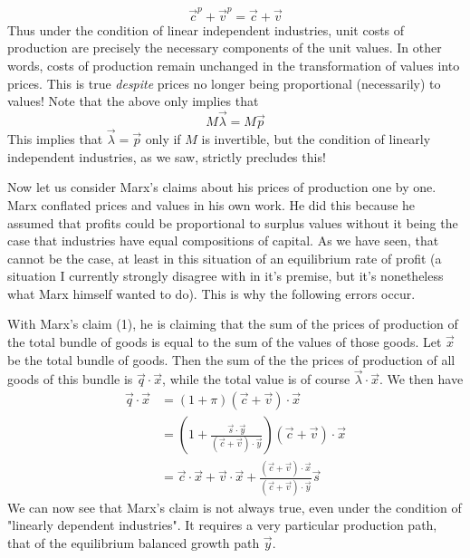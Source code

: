 \documentclass{article}
\theoremstyle{definition}
\theoremstyle{plain}
\theoremstyle{theorem}
\begin{document}
\[ \vec{c}^p + \vec{v}^p = \vec{c}+\vec{v} \]
Thus under the condition of linear independent industries, unit costs of production are precisely the necessary components of the unit values. In other words, costs of production remain unchanged in the transformation of values into prices. This is true \emph{despite} prices no longer being proportional (necessarily) to values! Note that the above only implies that
\[ M\vec{\lambda} = M\vec{p} \]
This implies that $\vec{\lambda} = \vec{p}$ only if $M$ is invertible, but the condition of linearly independent industries, as we saw, strictly precludes this! \par 
Now let us consider Marx's claims about his prices of production one by one. Marx conflated prices and values in his own work. He did this because he assumed that profits could be proportional to surplus values without it being the case that industries have equal compositions of capital. As we have seen, that cannot be the case, at least in this situation of an equilibrium rate of profit (a situation I currently strongly disagree with in it's premise, but it's nonetheless what Marx himself wanted to do). This is why the following errors occur. \par  
With Marx's claim (1), he is claiming that the sum of the prices of production of the total bundle of goods is equal to the sum of the values of those goods. Let $\vec{x}$ be the total bundle of goods. Then the sum of the the prices of production of all goods of this bundle is $\vec{q}\cdot \vec{x}$, while the total value is of course $\vec{\lambda} \cdot \vec{x}$. We then have 
\begin{align*}
	\vec{q}\cdot\vec{x} &= (1+\pi)(\vec{c}+\vec{v})\cdot\vec{x} \\
		&= (1+\frac{\vec{s}\cdot\vec{y}}{(\vec{c}+\vec{v})\cdot\vec{y}})(\vec{c}+\vec{v})\cdot\vec{x} \\
		&= \vec{c}\cdot\vec{x} + \vec{v}\cdot\vec{x} + \frac{(\vec{c}+\vec{v})\cdot\vec{x}}{(\vec{c}+\vec{v})\cdot\vec{y}}\vec{s}
\end{align*} 
We can now see that Marx's claim is not always true, even under the condition of "linearly dependent industries". It requires a very particular production path, that of the equilibrium balanced growth path $\vec{y}$. 
\end{document}
